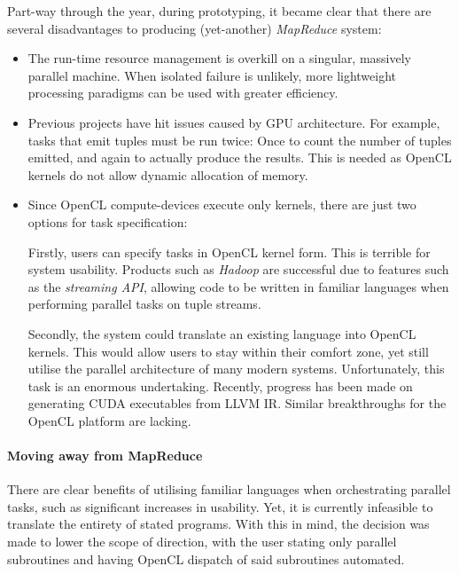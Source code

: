 Part-way through the year, during prototyping, it became clear that there are several disadvantages to producing (yet-another) \emph{MapReduce} system:
\begin{itemize}
\item The run-time resource management is overkill on a singular, massively parallel machine. When isolated failure is unlikely, more lightweight processing paradigms can be used with greater efficiency.

\item Previous projects have hit issues caused by \ac{GPU} architecture. For example, tasks that emit tuples must be run twice: Once to count the number of tuples emitted, and again to actually produce the results. This is needed as \ac{OpenCL} kernels do not allow dynamic allocation of memory.

\item Since \ac{OpenCL} compute-devices execute only kernels, there are just two options for task specification:

Firstly, users can specify tasks in \ac{OpenCL} kernel form. This is terrible for system usability. Products such as \emph{Hadoop} are successful due to features such as the \emph{streaming \ac{API}}, allowing code to be written in familiar languages when performing parallel tasks on tuple streams.

Secondly, the system could translate an existing language into \ac{OpenCL} kernels. This would allow users to stay within their comfort zone, yet still utilise the parallel architecture of many modern systems. Unfortunately, this task is an enormous undertaking. Recently, progress has been made on generating \ac{CUDA} executables from LLVM \ac{IR}. Similar breakthroughs for the \ac{OpenCL} platform are lacking.
\end{itemize}

\paragraph*{Moving away from MapReduce}
There are clear benefits of utilising familiar languages when orchestrating parallel tasks, such as significant increases in usability.
Yet, it is currently infeasible to translate the entirety of stated programs.
With this in mind, the decision was made to lower the scope of direction, with the user stating only parallel subroutines and having \ac{OpenCL} dispatch of said subroutines automated.

